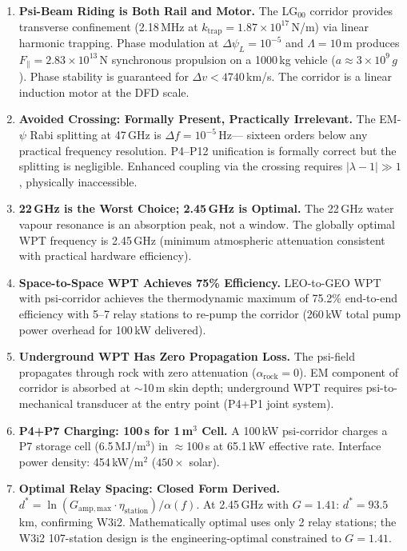 \documentclass[aps,prd,twocolumn,superscriptaddress]{revtex4-2}
\begin{document}
\begin{enumerate}

\item \textbf{Psi-Beam Riding is Both Rail and Motor.}
The LG$_{00}$ corridor provides transverse confinement (2.18\,MHz
at $k_\mathrm{trap} = 1.87\times10^{17}$\,N/m) via linear harmonic
trapping.  Phase modulation at $\Delta\psi_L = 10^{-5}$ and
$\Lambda = 10$\,m produces $F_\parallel = 2.83\times10^{13}$\,N
synchronous propulsion on a 1000\,kg vehicle ($a \approx 3\times10^9\,g$).
Phase stability is guaranteed for $\Delta v < 4740$\,km/s.
The corridor is a linear induction motor at the DFD scale.

\item \textbf{Avoided Crossing: Formally Present, Practically Irrelevant.}
The EM-$\psi$ Rabi splitting at 47\,GHz is $\Delta f = 10^{-5}$\,Hz---
sixteen orders below any practical frequency resolution.
P4--P12 unification is formally correct but the splitting is negligible.
Enhanced coupling via the crossing requires $|\lambda-1| \gg 1$,
physically inaccessible.

\item \textbf{22\,GHz is the Worst Choice; 2.45\,GHz is Optimal.}
The 22\,GHz water vapour resonance is an absorption peak, not a window.
The globally optimal WPT frequency is 2.45\,GHz (minimum atmospheric
attenuation consistent with practical hardware efficiency).

\item \textbf{Space-to-Space WPT Achieves 75\% Efficiency.}
LEO-to-GEO WPT with psi-corridor achieves the thermodynamic maximum
of 75.2\% end-to-end efficiency with 5--7 relay stations to re-pump
the corridor (260\,kW total pump power overhead for 100\,kW delivered).

\item \textbf{Underground WPT Has Zero Propagation Loss.}
The psi-field propagates through rock with zero attenuation
($\alpha_\mathrm{rock} = 0$).  EM component of corridor is absorbed
at $\sim$10\,m skin depth; underground WPT requires psi-to-mechanical
transducer at the entry point (P4+P1 joint system).

\item \textbf{P4+P7 Charging: 100\,s for 1\,m$^3$ Cell.}
A 100\,kW psi-corridor charges a P7 storage cell (6.5\,MJ/m$^3$)
in $\approx$100\,s at 65.1\,kW effective rate.  Interface power density:
454\,kW/m$^2$ ($450\times$ solar).

\item \textbf{Optimal Relay Spacing: Closed Form Derived.}
$d^* = \ln(G_\mathrm{amp,max}\cdot\eta_\mathrm{station})/\alpha(f)$.
At 2.45\,GHz with $G = 1.41$: $d^* = 93.5$\,km, confirming W3i2.
Mathematically optimal uses only 2 relay stations; the W3i2 107-station
design is the engineering-optimal constrained to $G = 1.41$.

\end{enumerate}
\end{document}
